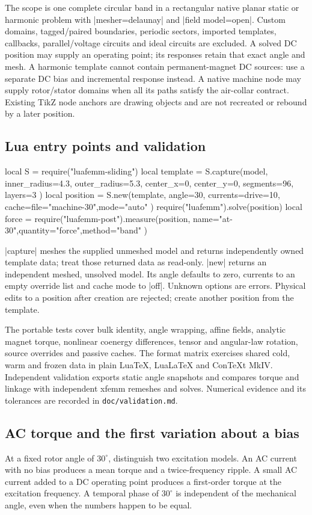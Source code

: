 The scope is one complete circular band in a rectangular native planar
static or harmonic problem with |mesher=delaunay| and |field model=open|. Custom domains,
tagged/paired boundaries, periodic sectors, imported templates, callbacks,
parallel/voltage circuits and ideal circuits are excluded. A solved DC position
may supply an operating point; its responses retain that exact angle and mesh.
A harmonic template cannot contain permanent-magnet DC sources: use a separate
DC bias and incremental response instead. A native machine node may supply rotor/stator domains
when all its paths satisfy the air-collar contract. Existing TikZ node anchors
are drawing objects and are not recreated or rebound by a later position.

\subsection{Lua entry points and validation}
\begin{codeexample}
local S = require("luafemm-sliding")
local template = S.capture(model, {
  inner_radius=4.3, outer_radius=5.3,
  center_x=0, center_y=0, segments=96, layers=3
})
local position = S.new(template, {
  angle=30, currents={drive=10},
  cache={file="machine-30",mode="auto"}
})
require("luafemm").solve(position)
local force = require("luafemm-post").measure(position, {
  name="at-30",quantity="force",method="band"
})
\end{codeexample}
|capture| meshes the supplied unmeshed model and returns independently owned
template data; treat those returned data as read-only. |new| returns an independent
meshed, unsolved model. Its angle defaults to zero, currents to an empty override
list and cache mode to |off|. Unknown options are errors. Physical edits to a
position after creation are rejected; create another position from the template.

The portable tests cover bulk identity, angle wrapping, affine fields, analytic
magnet torque, nonlinear coenergy differences, tensor and angular-law rotation,
source overrides and passive caches. The format matrix exercises shared cold,
warm and frozen data in plain LuaTeX, LuaLaTeX and ConTeXt MkIV. Independent validation exports static angle snapshots and compares torque
and linkage with independent xfemm remeshes and solves. Numerical evidence and
its tolerances are recorded in \nolinkurl{doc/validation.md}.


\subsection{AC torque and the first variation about a bias}
At a fixed rotor angle of $30^\circ$, distinguish two excitation models. An AC
current with no bias produces a mean torque and a twice-frequency ripple.
A small AC current added to a DC operating point produces a first-order torque
at the excitation frequency. A temporal phase of $30^\circ$ is independent of
the mechanical angle, even when the numbers happen to be equal.


